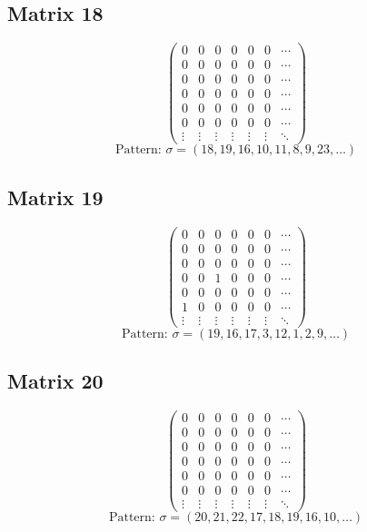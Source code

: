 \documentclass{article}
\begin{document}
\subsection*{Matrix 18}
\[
\begin{pmatrix}
  0 & 0 & 0 & 0 & 0 & 0 & \cdots \\
  0 & 0 & 0 & 0 & 0 & 0 & \cdots \\
  0 & 0 & 0 & 0 & 0 & 0 & \cdots \\
  0 & 0 & 0 & 0 & 0 & 0 & \cdots \\
  0 & 0 & 0 & 0 & 0 & 0 & \cdots \\
  0 & 0 & 0 & 0 & 0 & 0 & \cdots \\
\vdots & \vdots & \vdots & \vdots & \vdots & \vdots & \ddots
\end{pmatrix}
\]
\[
\text{Pattern: } \sigma = (18, 19, 16, 10, 11, 8, 9, 23, \ldots)
\]
\vspace{0.5em}

\subsection*{Matrix 19}
\[
\begin{pmatrix}
  0 & 0 & 0 & 0 & 0 & 0 & \cdots \\
  0 & 0 & 0 & 0 & 0 & 0 & \cdots \\
  0 & 0 & 0 & 0 & 0 & 0 & \cdots \\
  0 & 0 & 1 & 0 & 0 & 0 & \cdots \\
  0 & 0 & 0 & 0 & 0 & 0 & \cdots \\
  1 & 0 & 0 & 0 & 0 & 0 & \cdots \\
\vdots & \vdots & \vdots & \vdots & \vdots & \vdots & \ddots
\end{pmatrix}
\]
\[
\text{Pattern: } \sigma = (19, 16, 17, 3, 12, 1, 2, 9, \ldots)
\]
\vspace{0.5em}

\subsection*{Matrix 20}
\[
\begin{pmatrix}
  0 & 0 & 0 & 0 & 0 & 0 & \cdots \\
  0 & 0 & 0 & 0 & 0 & 0 & \cdots \\
  0 & 0 & 0 & 0 & 0 & 0 & \cdots \\
  0 & 0 & 0 & 0 & 0 & 0 & \cdots \\
  0 & 0 & 0 & 0 & 0 & 0 & \cdots \\
  0 & 0 & 0 & 0 & 0 & 0 & \cdots \\
\vdots & \vdots & \vdots & \vdots & \vdots & \vdots & \ddots
\end{pmatrix}
\]
\[
\text{Pattern: } \sigma = (20, 21, 22, 17, 18, 19, 16, 10, \ldots)
\]
\vspace{0.5em}
\end{document}

